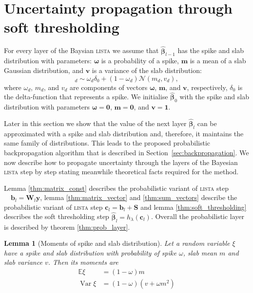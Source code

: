 \documentclass[letterpaper]{article}
\newtheorem{lemma}{Lemma}
\begin{document}
\section{Uncertainty propagation through soft thresholding}
\label{sec:fprop}
For every layer of the Baysian \textsc{lista} we assume that $\widehat{\boldsymbol\beta}_{l-1}$ has the spike and slab distribution with parameters: $\boldsymbol\omega$ is a probability of a spike, $\mathbf{m}$ is a mean of a slab Gaussian distribution, and $\mathbf{v}$ is a variance of the slab distribution:
\begin{equation}
[\boldsymbol\beta_{l-1}]_d \sim \omega_d \delta_0 + (1 - \omega_d)\mathcal{N}(m_d, v_d),
\end{equation}
where $\omega_d$, $m_d$, and $v_d$ are components of vectors $\boldsymbol\omega$, $\mathbf{m}$, and $\mathbf{v}$, respectively, $\delta_0$ is the delta-function that represents a spike. 
We initialise $\widehat{\boldsymbol\beta}_{0}$ with the spike and slab distribution with parameters $\boldsymbol\omega = \mathbf{0}$, $\mathbf{m} = \mathbf{0}$, and $\mathbf{v} = \mathbf{1}$. 

Later in this section we show that the value of the next layer $\widehat{\boldsymbol\beta}_l$ can be approximated with a spike and slab distribution and, therefore, it maintains the same family of distributions. This leads to the proposed probabilistic backpropagation algorithm that is described in Section~\ref{sec:backpropagation}. We now describe how to propagate uncertainty through the layers of the Bayesian \textsc{lista} step by step stating meanwhile theoretical facts required for the method.

Lemma \ref{thm:matrix_const} describes the probabilistic variant of \textsc{lista} step $\quad \mathbf{b}_l = \mathbf{W}_l \mathbf{y}$, lemma \ref{thm:matrix_vector} and \ref{thm:sum_vectors} describe the probabilistic variant of \textsc{lista} step $ \mathbf{c}_l = \mathbf{b}_l +\mathbf{S}$ and lemma \ref{thm:soft_thresholding} describes the soft thresholding step $\widehat{\boldsymbol\beta}_{l} = h_\lambda(\mathbf{c}_l)$. Overall the probabilistic layer is described by theorem \ref{thm:prob_layer}.

\begin{lemma}[Moments of spike and slab distribution]
\label{thm:moments_spsl}
Let a random variable $\xi$ have a spike and slab distribution with probability of spike $\omega$, slab mean $m$ and slab variance $v$. Then its moments are
\begin{subequations}
\begin{align}
\mathbb{E}\xi &= (1-\omega)m \\
\operatorname{Var}\xi & = (1-\omega)(v + \omega m^2)
\end{align}
\end{subequations}
\end{lemma}
\end{document}
